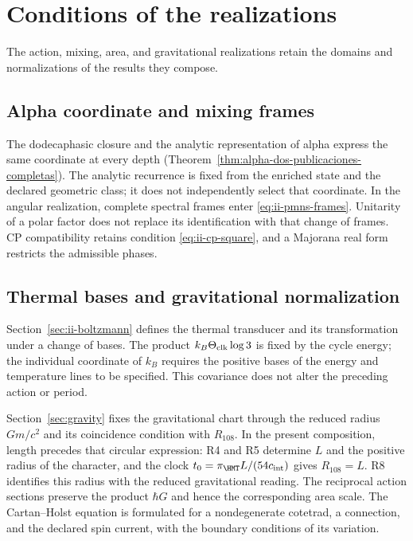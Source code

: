 \section{Conditions of the realizations}
\label{sec:ii-condiciones-realizaciones}

The action, mixing, area, and gravitational realizations retain the
domains and normalizations of the results they compose.

\subsection{Alpha coordinate and mixing frames}

The dodecaphasic closure and the analytic representation of alpha express
the same coordinate at every depth
(Theorem~\ref{thm:alpha-dos-publicaciones-completas}).
The analytic recurrence is fixed from the enriched state and the declared
geometric class; it does not independently select that coordinate.
In the angular realization, complete spectral frames enter
\eqref{eq:ii-pmns-frames}. Unitarity of a polar factor does not replace its
identification with that change of frames. CP compatibility retains
condition \eqref{eq:ii-cp-square}, and a Majorana real form restricts
the admissible phases.

\subsection{Thermal bases and gravitational normalization}

Section~\ref{sec:ii-boltzmann} defines the thermal transducer and its
transformation under a change of bases. The product
\(k_B\Theta_{\rm clk}\log3\) is fixed by the cycle energy;
the individual coordinate of \(k_B\) requires the positive bases of
the energy and temperature lines to be specified. This covariance
does not alter the preceding action or period.

Section~\ref{sec:gravity} fixes the gravitational chart through the
reduced radius \(Gm/c^2\) and its coincidence condition with \(R_{108}\).
In the present composition, length precedes that circular expression:
R4 and R5 determine \(L\) and the positive radius of the character,
and the clock \(t_0=\pi_{\HMT}L/(54c_{\rm int})\) gives
\(R_{108}=L\). R8 identifies this radius with the reduced
gravitational reading.
The reciprocal action sections preserve the product \(\hbar G\)
and hence the corresponding area scale. The Cartan--Holst equation
is formulated for a nondegenerate cotetrad, a connection, and the
declared spin current, with the boundary conditions of its variation.

